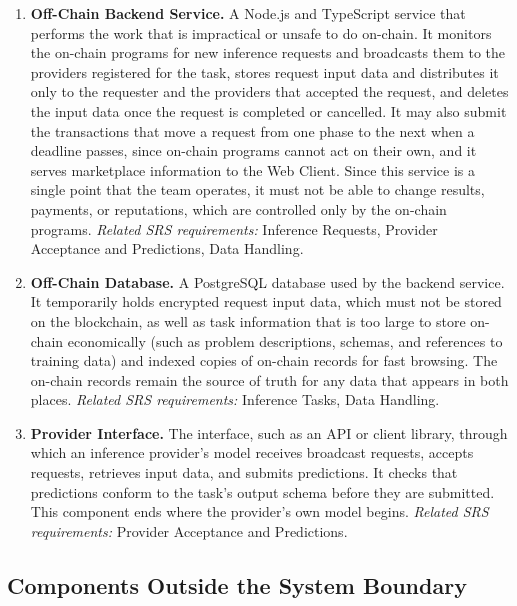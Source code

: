 \documentclass{article}
\begin{document}
\begin{enumerate}
\item \textbf{Off-Chain Backend Service.} A Node.js and TypeScript service that
performs the work that is impractical or unsafe to do on-chain. It monitors the
on-chain programs for new inference requests and broadcasts them to the
providers registered for the task, stores request input data and distributes it
only to the requester and the providers that accepted the request, and deletes
the input data once the request is completed or cancelled. It may also submit
the transactions that move a request from one phase to the next when a deadline
passes, since on-chain programs cannot act on their own, and it serves
marketplace information to the Web Client. Since this service is a single
point that the team operates, it must not be able to change results, payments,
or reputations, which are controlled only by the on-chain programs.
\textit{Related SRS requirements:} Inference Requests, Provider Acceptance and
Predictions, Data Handling.

\item \textbf{Off-Chain Database.} A PostgreSQL database used by the backend
service. It temporarily holds encrypted request input data, which must not be
stored on the blockchain, as well as task information that is too large to
store on-chain economically (such as problem descriptions, schemas, and
references to training data) and indexed copies of on-chain records for fast
browsing. The on-chain records remain the source of truth for any data that
appears in both places. \textit{Related SRS requirements:} Inference Tasks,
Data Handling.

\item \textbf{Provider Interface.} The interface, such as an API or client
library, through which an inference provider's model receives broadcast
requests, accepts requests, retrieves input data, and submits predictions. It
checks that predictions conform to the task's output schema before they are
submitted. This component ends where the provider's own model begins.
\textit{Related SRS requirements:} Provider Acceptance and Predictions.

\end{enumerate}

\subsection{Components Outside the System Boundary}
\end{document}
